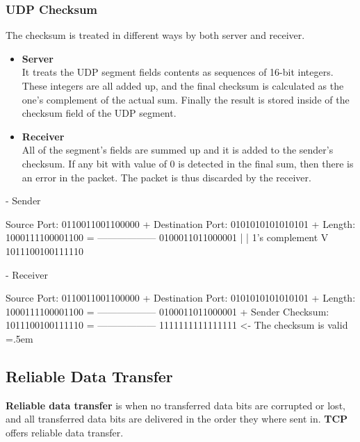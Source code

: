 \documentclass{article}
\newenvironment{cverbatim}
 {\SaveVerbatim{cverb}}
 {\endSaveVerbatim
  \flushleft\fboxrule=0pt\fboxsep=.5em
  \colorbox{cverbbg}{\BUseVerbatim{cverb}}%
  \endflushleft
}
\begin{document}
\subsubsection{UDP Checksum}
The checksum is treated in different ways by both server and receiver.

\begin{itemize}
	\item \textbf{Server}
	\vspace{.2cm} \\
	It treats the UDP segment fields contents as sequences of 16-bit integers. These integers are all added up, and the final checksum is calculated as the one's complement of the actual sum. Finally the result is stored inside of the checksum field of the UDP segment.
	
	\item \textbf{Receiver}
	\vspace{.2cm} \\
	All of the segment's fields are summed up and it is added to the sender's checksum. If any bit with value of 0 is detected in the final sum, then there is an error in the packet. The packet is thus discarded by the receiver.
\end{itemize}
\begin{cverbatim}
- Sender
 
  Source Port:       0110011001100000 +
  Destination Port:  0101010101010101 +
  Length:            1000111100001100 =
                     ------------------
                     0100011011000001 
                             |
                             | 1's complement
                             V
                     1011100100111110
                      
- Receiver
 
  Source Port:       0110011001100000 +
  Destination Port:  0101010101010101 +
  Length:            1000111100001100 =
                     ------------------
                     0100011011000001 +
  Sender Checksum:   1011100100111110 =
                     ------------------
                     1111111111111111   <- The checksum is valid
\end{cverbatim}

\subsection{Reliable Data Transfer}
\textbf{Reliable data transfer} is when no transferred data bits are corrupted or lost, and all transferred data bits are delivered in the order they where sent in. \textbf{TCP} offers reliable data transfer.
\end{document}
